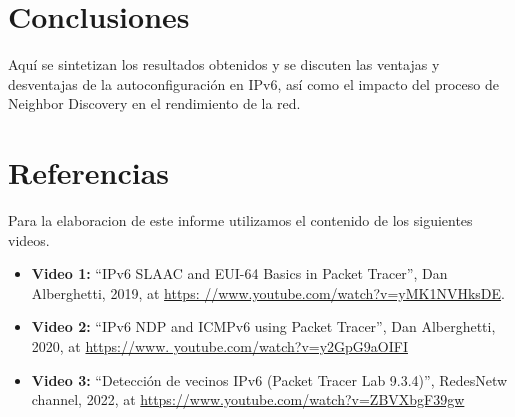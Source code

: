 \documentclass[a4paper,12pt]{article}
\begin{document}
\section{Conclusiones}
Aquí se sintetizan los resultados obtenidos y se discuten las ventajas y desventajas de la autoconfiguración en IPv6, así como el impacto del proceso de Neighbor Discovery en el rendimiento de la red.

\section{Referencias}
Para la elaboracion de este informe utilizamos el contenido de los siguientes videos. 
\begin{itemize}
  \item \textbf{Video 1:} “IPv6 SLAAC and EUI-64 Basics in Packet Tracer”, Dan Alberghetti, 2019, at \url{https:
  //www.youtube.com/watch?v=yMK1NVHksDE}.
  \item \textbf{Video 2:} “IPv6 NDP and ICMPv6 using Packet Tracer”, Dan Alberghetti, 2020, at \url{https://www.
  youtube.com/watch?v=y2GpG9aOIFI}
  \item \textbf{Video 3:} “Detección de vecinos IPv6 (Packet Tracer Lab 9.3.4)”, RedesNetw channel, 2022, at \url{https://www.youtube.com/watch?v=ZBVXbgF39gw}
\end{itemize}
\end{document}
